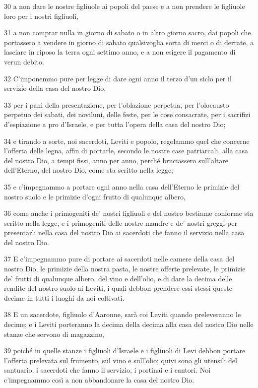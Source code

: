 \par 30 a non dare le nostre figliuole ai popoli del paese e a non prendere le figliuole loro per i nostri figliuoli,
\par 31 a non comprar nulla in giorno di sabato o in altro giorno sacro, dai popoli che portassero a vendere in giorno di sabato qualsivoglia sorta di merci o di derrate, a lasciare in riposo la terra ogni settimo anno, e a non esigere il pagamento di verun debito.
\par 32 C'imponemmo pure per legge di dare ogni anno il terzo d'un siclo per il servizio della casa del nostro Dio,
\par 33 per i pani della presentazione, per l'oblazione perpetua, per l'olocausto perpetuo dei sabati, dei noviluni, delle feste, per le cose consacrate, per i sacrifizi d'espiazione a pro d'Israele, e per tutta l'opera della casa del nostro Dio;
\par 34 e tirando a sorte, noi sacerdoti, Leviti e popolo, regolammo quel che concerne l'offerta delle legna, affin di portarle, secondo le nostre case patriarcali, alla casa del nostro Dio, a tempi fissi, anno per anno, perché bruciassero sull'altare dell'Eterno, del nostro Dio, come sta scritto nella legge;
\par 35 e c'impegnammo a portare ogni anno nella casa dell'Eterno le primizie del nostro suolo e le primizie d'ogni frutto di qualunque albero,
\par 36 come anche i primogeniti de' nostri figliuoli e del nostro bestiame conforme sta scritto nella legge, e i primogeniti delle nostre mandre e de' nostri greggi per presentarli nella casa del nostro Dio ai sacerdoti che fanno il servizio nella casa del nostro Dio.
\par 37 E c'impegnammo pure di portare ai sacerdoti nelle camere della casa del nostro Dio, le primizie della nostra pasta, le nostre offerte prelevate, le primizie de' frutti di qualunque albero, del vino e dell'olio, e di dare la decima delle rendite del nostro suolo ai Leviti, i quali debbon prendere essi stessi queste decime in tutti i luoghi da noi coltivati.
\par 38 E un sacerdote, figliuolo d'Aaronne, sarà coi Leviti quando preleveranno le decime; e i Leviti porteranno la decima della decima alla casa del nostro Dio nelle stanze che servono di magazzino,
\par 39 poiché in quelle stanze i figliuoli d'Israele e i figliuoli di Levi debbon portare l'offerta prelevata sul frumento, sul vino e sull'olio; quivi sono gli utensili del santuario, i sacerdoti che fanno il servizio, i portinai e i cantori. Noi c'impegnammo così a non abbandonare la casa del nostro Dio.


